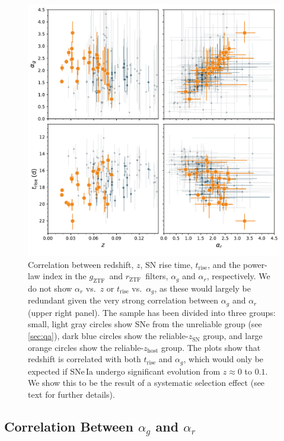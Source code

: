\documentclass[twocolumn]{./aastex63}
\newcommand{\rztf}{$r_\mathrm{ZTF}$}
\newcommand{\gztf}{$g_\mathrm{ZTF}$}
\begin{document}
\begin{figure}
    \centering
    \includegraphics[width=6in]{./figures/param_correlations.pdf}
    \caption{Correlation between redshift, $z$, SN rise time,
    $t_\mathrm{rise}$, and the power-law index in the \gztf\ and \rztf\
    filters, $\alpha_g$ and $\alpha_r$, respectively. We do not show
    $\alpha_r$ vs.~$z$ or $t_\mathrm{rise}$ vs.~$\alpha_g$, as these would
    largely be redundant given the very strong correlation between $\alpha_g$
    and $\alpha_r$ (upper right panel). The sample has been divided into three
    groups: small, light gray circles show SNe from the unreliable group (see
    \ref{sec:qa}), dark blue circles show the reliable-$z_\mathrm{SN}$ group,
    and large orange circles show the reliable-$z_\mathrm{host}$ group. The
    plots show that redshift is correlated with both $t_\mathrm{rise}$ and
    $\alpha_g$, which would only be expected if SNe\,Ia undergo significant
    evolution from $z \approx 0$ to $0.1$. We show this to be the result
    of a systematic selection effect (see text for further details). }
    \label{fig:model_parameters}
\end{figure}

\subsection{Correlation Between $\alpha_g$ and $\alpha_r$}\label{sec:alpha_correlation}
\end{document}
